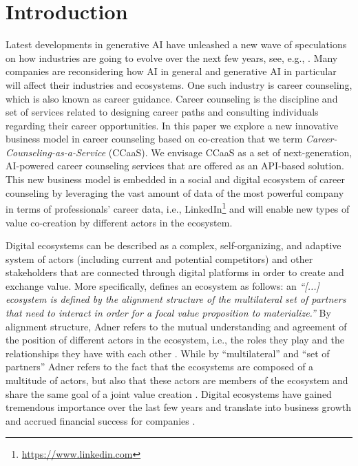 \section{Introduction}
\label{sec:introduction}

Latest developments in generative AI have unleashed a new wave of speculations on how industries are going to
evolve over the next few years, see, e.g., \cite{chuiHowGenerativeAI2022}. Many companies are reconsidering how
AI in general and generative AI in particular will affect their industries and ecosystems. One such industry is
career counseling, which is also known as career guidance. Career counseling is the discipline and set of services
related to designing career paths and consulting individuals regarding their career opportunities.
In this paper we explore a new innovative business model in career counseling based on co-creation that we term
\textit{Career-Counseling-as-a-Service} (CCaaS). We envisage CCaaS as a set of next-generation, AI-powered career
counseling services that are offered as an API-based solution. This new business model is embedded in a social and
digital ecosystem of career counseling by leveraging the vast amount of data of the most powerful company in terms
of professionals' career data, i.e., LinkedIn\footnote[1]{\url{https://www.linkedin.com}} and will enable new types
of value co-creation by different actors in the ecosystem.

Digital ecosystems can be described as a complex, self-organizing, and adaptive system of actors (including current and
potential competitors) and other stakeholders that are connected through digital platforms in order to create and exchange
value. More specifically, \cite{adnerEcosystemStructureActionable2017} defines an ecosystem as follows: an \textit{``[...]
ecosystem is defined by the alignment structure of the multilateral set of partners that need to interact in order for a
focal value proposition to materialize.''} By alignment structure, Adner refers to the mutual understanding and agreement
of the position of different actors in the ecosystem, i.e., the roles they play and the relationships they have with each other
\citep[p. 42]{adnerEcosystemStructureActionable2017}. While by ``multilateral'' and ``set of partners'' Adner refers to
the fact that the ecosystems are composed of a multitude of actors, but also that these actors are members of the ecosystem
and share the same goal of a joint value creation \citep[p. 42-43]{adnerEcosystemStructureActionable2017}. Digital ecosystems
have gained tremendous importance over the last few years and translate into business growth and accrued financial success
for companies \citep{weillThrivingIncreasinglyDigital2015}.

